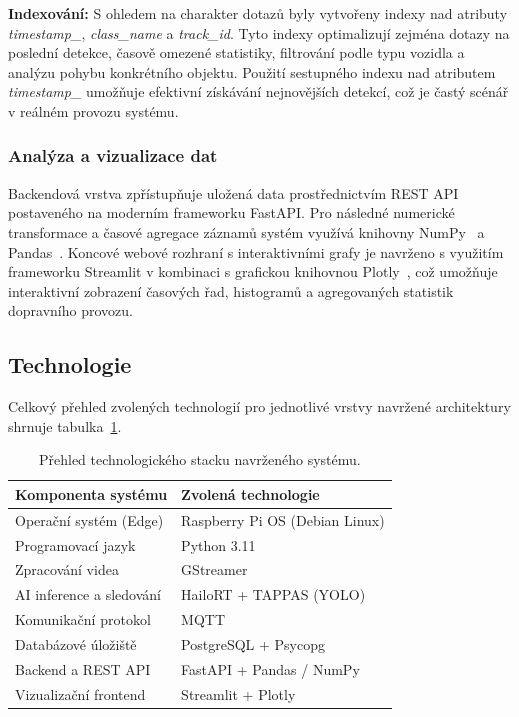 \documentclass[male,czech,api_bc]{kitheses}
\renewcommand{\arraystretch}{1.23}
\begin{document}
\textbf{Indexování:} S ohledem na charakter dotazů byly vytvořeny indexy nad atributy \textit{timestamp\_}, \textit{class\_name} a \textit{track\_id}. Tyto indexy optimalizují zejména dotazy na poslední detekce, časově omezené statistiky, filtrování podle typu vozidla a analýzu pohybu konkrétního objektu. Použití sestupného indexu nad atributem \textit{timestamp\_} umožňuje efektivní získávání nejnovějších detekcí, což je častý scénář v reálném provozu systému.

\subsubsection{Analýza a vizualizace dat}
Backendová vrstva zpřístupňuje uložená data prostřednictvím REST API postaveného na moderním frameworku FastAPI. Pro následné numerické transformace a časové agregace záznamů systém využívá knihovny NumPy~\cite{harris_numpy_2020} a Pandas~\cite{mckinney_pandas_2010}. Koncové webové rozhraní s interaktivními grafy je navrženo s využitím frameworku Streamlit v kombinaci s grafickou knihovnou Plotly~\cite{plotly_docs_2015}, což umožňuje interaktivní zobrazení časových řad, histogramů a agregovaných statistik dopravního provozu.

\subsection{Technologie}
Celkový přehled zvolených technologií pro jednotlivé vrstvy navržené architektury shrnuje tabulka~\ref{tab:tech_stack}.

\begin{table}[H]
    \centering
    \renewcommand{\arraystretch}{1.2}
    \begin{tabular}{|l|l|}
        \hline
        \textbf{Komponenta systému} & \textbf{Zvolená technologie} \\ \hline
        Operační systém (Edge) & Raspberry Pi OS (Debian Linux) \\ \hline
        Programovací jazyk & Python 3.11 \\ \hline
        Zpracování videa & GStreamer \\ \hline
        AI inference a sledování & HailoRT + TAPPAS (YOLO) \\ \hline
        Komunikační protokol & MQTT \\ \hline
        Databázové úložiště & PostgreSQL + Psycopg \\ \hline
        Backend a REST API & FastAPI + Pandas / NumPy \\ \hline
        Vizualizační frontend & Streamlit + Plotly \\ \hline
    \end{tabular}
    \caption{Přehled technologického stacku navrženého systému.}
    \label{tab:tech_stack}
\end{table}
\end{document}
